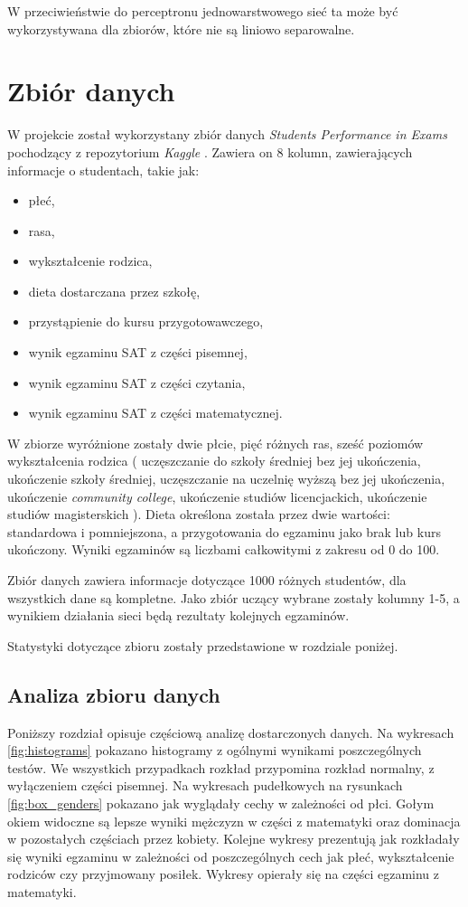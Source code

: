 \documentclass[12pt]{article}
\begin{document}
W przeciwieństwie do perceptronu jednowarstwowego sieć ta może być wykorzystywana dla zbiorów, które nie są liniowo separowalne.


\pagebreak
\section{Zbiór danych}
W projekcie został wykorzystany zbiór danych \textit{Students Performance in Exams} \cite{kaggle-student} pochodzący z repozytorium \textit{Kaggle} \cite{kaggle}. Zawiera on 8 kolumn, zawierających informacje o studentach, takie jak:
\begin{itemize}
\item płeć,
\item rasa,
\item wykształcenie rodzica,
\item dieta dostarczana przez szkołę,
\item przystąpienie do kursu przygotowawczego,
\item wynik egzaminu SAT z części pisemnej,
\item wynik egzaminu SAT z części czytania,
\item wynik egzaminu SAT z części matematycznej.
\end{itemize}

W zbiorze wyróżnione zostały dwie płcie, pięć różnych ras, sześć poziomów wykształcenia rodzica ( uczęszczanie do szkoły średniej bez jej ukończenia, ukończenie szkoły średniej, uczęszczanie na uczelnię wyższą bez jej ukończenia, ukończenie \textit{community college}, ukończenie studiów licencjackich, ukończenie studiów magisterskich ). Dieta określona została przez dwie wartości: standardowa i pomniejszona, a przygotowania do egzaminu jako brak lub kurs ukończony. Wyniki egzaminów są liczbami całkowitymi z zakresu od 0 do 100.

Zbiór danych zawiera informacje dotyczące 1000 różnych studentów, dla wszystkich dane są kompletne. Jako zbiór uczący wybrane zostały kolumny 1-5, a wynikiem działania sieci będą rezultaty kolejnych egzaminów.

Statystyki dotyczące zbioru zostały przedstawione w rozdziale poniżej.

\subsection{Analiza zbioru danych}
Poniższy rozdział opisuje częściową analizę dostarczonych danych. Na wykresach \ref{fig:histograms} pokazano histogramy z ogólnymi wynikami poszczególnych testów. We wszystkich przypadkach rozkład przypomina rozkład normalny, z wyłączeniem części pisemnej. Na wykresach pudełkowych na rysunkach \ref{fig:box_genders} pokazano jak wyglądały cechy w zależności od płci. Gołym okiem widoczne są lepsze wyniki mężczyzn w części z matematyki oraz dominacja w pozostałych częściach przez kobiety. Kolejne wykresy prezentują jak rozkładały się wyniki egzaminu w zależności od poszczególnych cech jak płeć, wykształcenie rodziców czy przyjmowany posiłek. Wykresy opierały się na części egzaminu z matematyki.
\end{document}
